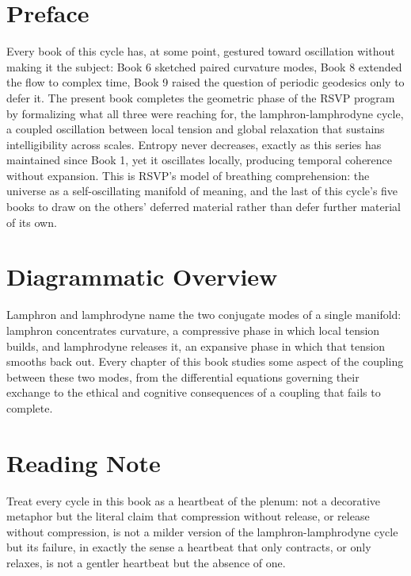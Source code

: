 \chapter*{Preface}

Every book of this cycle has, at some point, gestured toward oscillation without making it the subject: Book 6 sketched paired curvature modes, Book 8 extended the flow to complex time, Book 9 raised the question of periodic geodesics only to defer it. The present book completes the geometric phase of the RSVP program by formalizing what all three were reaching for, the lamphron-lamphrodyne cycle, a coupled oscillation between local tension and global relaxation that sustains intelligibility across scales. Entropy never decreases, exactly as this series has maintained since Book 1, yet it oscillates locally, producing temporal coherence without expansion. This is RSVP's model of breathing comprehension: the universe as a self-oscillating manifold of meaning, and the last of this cycle's five books to draw on the others' deferred material rather than defer further material of its own.

\chapter*{Diagrammatic Overview}

Lamphron and lamphrodyne name the two conjugate modes of a single manifold: lamphron concentrates curvature, a compressive phase in which local tension builds, and lamphrodyne releases it, an expansive phase in which that tension smooths back out. Every chapter of this book studies some aspect of the coupling between these two modes, from the differential equations governing their exchange to the ethical and cognitive consequences of a coupling that fails to complete.

\chapter*{Reading Note}

Treat every cycle in this book as a heartbeat of the plenum: not a decorative metaphor but the literal claim that compression without release, or release without compression, is not a milder version of the lamphron-lamphrodyne cycle but its failure, in exactly the sense a heartbeat that only contracts, or only relaxes, is not a gentler heartbeat but the absence of one.

